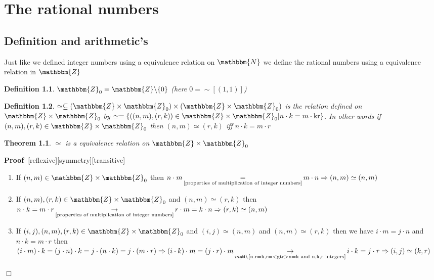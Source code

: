 \documentclass{book}
\newcommand{\Rightarrowlim}{\mathop{\rightarrow}\limits}
\newcommand{\equallim}{\mathop{=}\limits}
\newcommand{\nobracket}{}
\newcommand{\nocomma}{}
\newcommand{\tmop}[1]{\ensuremath{\operatorname{#1}}}
\newenvironment{proof}{\noindent\textbf{Proof\ }}{\hspace*{\fill}$\Box$\medskip}
\newtheorem{definition}{Definition}
{\theorembodyfont{\rmfamily}\newtheorem{example}{Example}}
\newtheorem{theorem}{Theorem}
\begin{document}
{{\chapter{The rational numbers}

\section{Definition and arithmetic's}

Just like we defined integer numbers using a equivalence relation on
$\mathbbm{N}$ we define the rational numbers using a equivalence relation in
$\mathbbm{Z}$

\begin{definition}
  $\mathbbm{Z}_0 =\mathbbm{Z} \backslash \{ 0 \}$ (here $0 = \sim [(1, 1)]$)
\end{definition}

\begin{definition}
  $\simeq \subseteq (\mathbbm{Z} \times \mathbbm{Z}_0) \times (\mathbbm{Z}
  \times \mathbbm{Z}_0)$ is the relation defined on $\mathbbm{Z} \times
  \mathbbm{Z}_0$ by $\simeq = \{ ((n, m), (r, k)) \in \mathbbm{Z} \times
  \mathbbm{Z}_0 | n \cdot k = m \cdot \tmop{kr} \nobracket \}$. In other words
  if $(n, m), (r, k) \in \mathbbm{Z} \times \mathbbm{Z}_0$ then $(n, m) \simeq
  (r, k)$ iff $n \cdot k = m \cdot r$
\end{definition}

\begin{theorem}
  $\simeq$ is a equivalence relation on $\mathbbm{Z} \times \mathbbm{Z}_0$
\end{theorem}

\begin{proof}[reflexive][symmetry][transitive]
  
  \begin{enumerate}
    \item If $(n, m) \in \mathbbm{Z} \times \mathbbm{Z}_0$ then $n \cdot m
    \equallim_{\text{\ref{properties of multiplication of integer numbers}}} m
    \cdot n \Rightarrow (n, m) \simeq (n, m)$
    
    \item If $(n, m), (r, k) \in \mathbbm{Z} \times \mathbbm{Z}_0$ and $(n, m)
    \simeq (r, k)$ then $n \cdot k = m \cdot r
    \Rightarrowlim_{\text{\ref{properties of multiplication of integer
    numbers}}} r \cdot m = k \cdot n \Rightarrow (r, k) \simeq (n, m)$
    
    \item If $(i, j) \nocomma, (n, m), (r, k) \in \mathbbm{Z} \times
    \mathbbm{Z}_0$ and $(i, j) \simeq (n, m)$ and $(n, m) \simeq (r, k)$ then
    we have $i \cdot m = j \cdot n$ and $n \cdot k = m \cdot r$ then $(i \cdot
    m) \cdot k = (j \cdot n) \cdot k = j \cdot (n \cdot k) = j \cdot (m \cdot
    r) \Rightarrow (i \cdot k) \cdot m = (j \cdot r) \cdot m \Rightarrowlim_{m
    \neq 0, \text{\ref{n.r=k,r=<gtr>n=k and n,k,r integers}}} i \cdot k = j
    \cdot r \Rightarrow (i, j) \simeq (k, r)$
  \end{enumerate}
\end{proof}

}}
\end{document}
